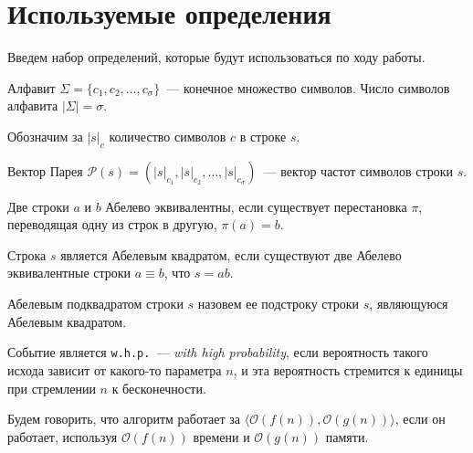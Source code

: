 \section{Используемые определения}

Введем набор определений, которые будут использоваться по ходу работы. 

\begin{definition}
Алфавит $\Sigma=\{c_1, c_2, \ldots, c_\sigma\}$~--- конечное множество символов. Число символов алфавита $|\Sigma|=\sigma$.
\end{definition}

\begin{definition}
Обозначим за $|s|_c$ количество символов $c$ в строке $s$.
\end{definition}


\begin{definition}
Вектор Парея $\mathcal{P}(s)=(|s|_{c_1}, |s|_{c_2}, \ldots, |s|_{c_\sigma})$~--- вектор частот символов строки $s$.
\end{definition}

\begin{definition}
Две строки $a$ и $b$ Абелево эквивалентны, если существует перестановка $\pi$, переводящая одну из строк в другую, $\pi(a)=b$.
\end{definition}

\begin{definition}
Строка $s$ является Абелевым квадратом, если существуют две Абелево эквивалентные строки $a \equiv b$, что $s = ab$.
\end{definition}

\begin{definition}
Абелевым подквадратом строки $s$ назовем ее подстроку строки $s$, являющуюся Абелевым квадратом.
\end{definition}

\begin{definition}
Событие является \texttt{w.h.p.}~--- \textit{with high probability}, если вероятность такого исхода зависит от какого-то параметра $n$, и эта вероятность стремится к единицы при стремлении $n$ к бесконечности.
\end{definition}

\begin{definition}
Будем говорить, что алгоритм работает за $\langle \mathcal{O}(f(n)), \mathcal{O}(g(n)) \rangle$, если он работает, используя $\mathcal{O}(f(n))$ времени и  $\mathcal{O}(g(n))$ памяти.
\end{definition}

